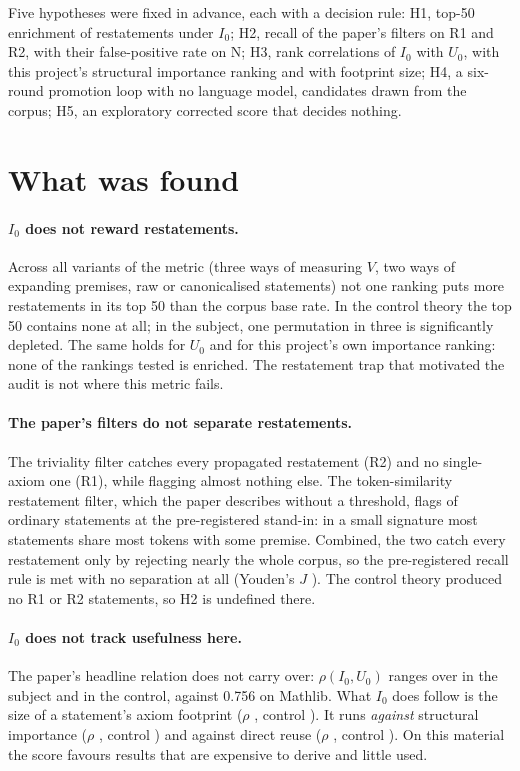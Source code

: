 \documentclass[11pt,a4paper]{article}
\newcommand{\Iz}{I_0}
\newcommand{\Uz}{U_0}
\begin{document}
Five hypotheses were fixed in advance, each with a decision rule:
H1, top-50 enrichment of restatements under $\Iz$; H2, recall of the paper's
filters on R1 and R2, with their false-positive rate on N; H3, rank
correlations of $\Iz$ with $\Uz$, with this project's structural importance
ranking and with footprint size; H4, a six-round promotion loop with no
language model, candidates drawn from the corpus; H5, an exploratory corrected
score that decides nothing.

\section{What was found}

\paragraph{$\Iz$ does not reward restatements.}
Across all \hOneVariants{} variants of the metric (three ways of measuring $V$, two
ways of expanding premises, raw or canonicalised statements) not one ranking
puts more restatements in its top 50 than the corpus base rate. In the control
theory the top 50 contains none at all; in the subject, one permutation in three
is significantly depleted. The same holds for $\Uz$ and for this project's own
importance ranking: none of the \hOneRankings{} rankings tested is enriched.
The restatement trap that motivated the audit is not where this metric fails.

\paragraph{The paper's filters do not separate restatements.}
The triviality filter catches every propagated restatement (R2) and no
single-axiom one (R1), while flagging almost nothing else. The token-similarity
restatement filter, which the paper describes without a threshold, flags
\hTwoRestFPR{} of ordinary statements at the pre-registered stand-in: in a
small signature most statements share most tokens with some premise. Combined,
the two catch every restatement only by rejecting nearly the whole corpus, so
the pre-registered recall rule is met with no separation at all
(Youden's $J$ \hTwoCombJ). The control theory produced no R1 or R2 statements,
so H2 is undefined there.

\paragraph{$\Iz$ does not track usefulness here.}
The paper's headline relation does not carry over: $\rho(\Iz,\Uz)$ ranges over
\subjectRhoU{} in the subject and \controlRhoU{} in the control, against 0.756
on Mathlib. What $\Iz$ does follow is the size of a statement's axiom footprint
($\rho$ \subjectRhoFoot{}, control \controlRhoFoot). It runs \emph{against}
structural importance ($\rho$ \subjectRhoImp{}, control \controlRhoImp) and
against direct reuse ($\rho$ \subjectRhoUsers{}, control \controlRhoUsers). On
this material the score favours results that are expensive to derive and
little used.
\end{document}
